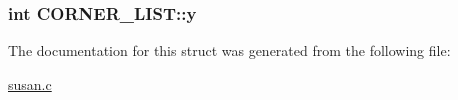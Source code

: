 \hypertarget{structCORNER__LIST_a0ae16f5cb4b165c2010fb822dbf5e3dc}{
\subsubsection[{y}]{\setlength{\rightskip}{0pt plus 5cm}int C\-O\-R\-N\-E\-R\-\_\-\-L\-I\-S\-T\-::y}}\label{structCORNER__LIST_a0ae16f5cb4b165c2010fb822dbf5e3dc}


The documentation for this struct was generated from the following file\-:\begin{DoxyCompactItemize}
\item 
\hyperlink{susan_8c}{susan.\-c}\end{DoxyCompactItemize}

